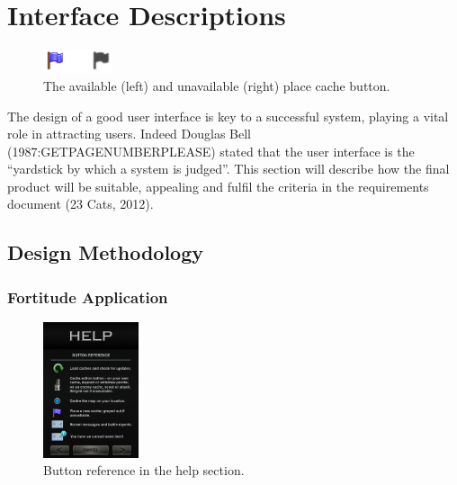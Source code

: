 \section{Interface Descriptions}

\begin{figure}
	\vspace{-25pt}
	\begin{center}
	\includegraphics[width=0.18\textwidth]{images/flags_greye}
	\caption{The available (left) and unavailable (right) place cache button.}
	\label{flags_greye}
	\end{center}
	\vspace{-10pt}
\end{figure}

The design of a good user interface is key to a successful system, playing a vital role in attracting users. Indeed Douglas Bell (1987:GETPAGENUMBERPLEASE) stated that the user interface is the ``yardstick by which a system is judged''. This section will describe how the final product will be suitable, appealing and fulfil the criteria in the requirements document (23 Cats, 2012).
\vspace{-10pt}

\subsection{Design Methodology}
\subsubsection{Fortitude Application}

\begin{figure}
	\vspace{-20pt}
	\begin{center}
	\includegraphics[width=0.25\textwidth]{images/help_mockup}
	\caption{Button reference in the help section.}
	\label{help_mockup}
	\end{center}
	\vspace{-20pt}
\end{figure}

